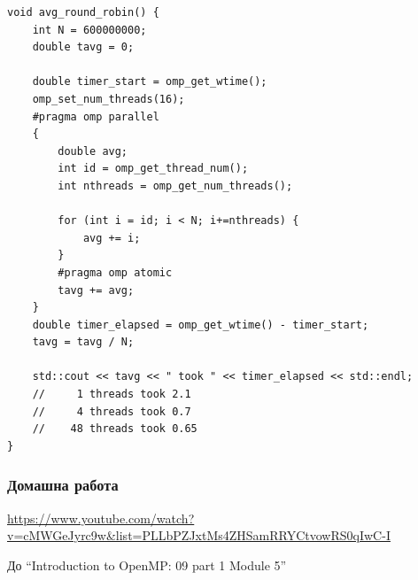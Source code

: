 \documentclass{beamer}
\begin{document}
\begin{frame}[fragile]
\begin{lstlisting}
void avg_round_robin() {
    int N = 600000000;
    double tavg = 0;

    double timer_start = omp_get_wtime();
    omp_set_num_threads(16);
    #pragma omp parallel
    {
        double avg;
        int id = omp_get_thread_num();
        int nthreads = omp_get_num_threads();

        for (int i = id; i < N; i+=nthreads) {
            avg += i;
        }
        #pragma omp atomic
        tavg += avg;
    }
    double timer_elapsed = omp_get_wtime() - timer_start;
    tavg = tavg / N;

    std::cout << tavg << " took " << timer_elapsed << std::endl;
    //     1 threads took 2.1
    //     4 threads took 0.7
    //    48 threads took 0.65
}
\end{lstlisting}
\end{frame}


\begin{frame}
  \frametitle{Домашна работа}
\url{https://www.youtube.com/watch?v=cMWGeJyrc9w&list=PLLbPZJxtMs4ZHSamRRYCtvowRS0qIwC-I}  


До ``Introduction to OpenMP: 09 part 1 Module 5''

\end{frame}
\end{document}
